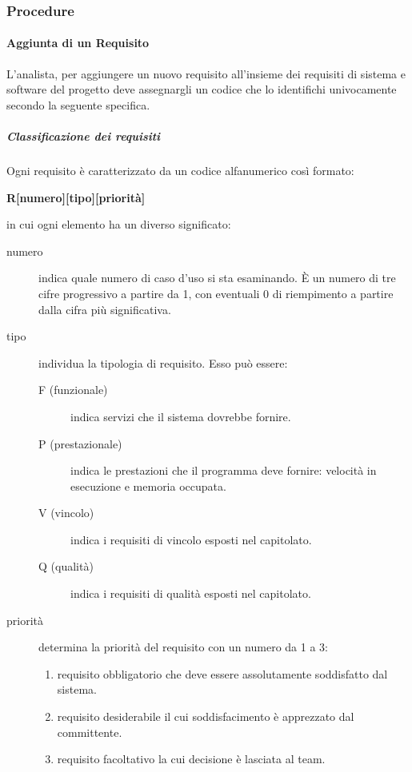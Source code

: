 \documentclass[../../norme-di-progetto.tex]{subfiles}
\begin{document}


\subsubsection{Procedure}%
\label{subs:procedure}

\paragraph{Aggiunta di un Requisito}%
\label{par:aggiunta_requisito}
L'analista, per aggiungere un nuovo requisito all'insieme dei requisiti di sistema e software del progetto deve assegnargli un codice che lo identifichi univocamente secondo la seguente specifica.

\subparagraph{Classificazione dei requisiti}%
\label{subp:classificazione_dei_requisiti}

Ogni requisito è caratterizzato da un codice alfanumerico così formato:
\begin{center}
  \textbf{R[numero][tipo][priorità]}
\end{center}
in cui ogni elemento ha un diverso significato:
\begin{description}
  \item [numero] indica quale numero di caso d'uso si sta esaminando. È un numero di tre cifre progressivo a partire da 1, con eventuali 0 di riempimento a partire dalla cifra più significativa.
  \item [tipo] individua la tipologia di requisito. Esso può essere:
        \begin{description}
          \item [F (funzionale)] indica servizi che il sistema dovrebbe fornire.
          \item [P (prestazionale)] indica le prestazioni che il programma deve fornire: velocità in esecuzione e memoria occupata.
          \item [V (vincolo)] indica i requisiti di vincolo esposti nel capitolato.
          \item [Q (qualità)] indica i requisiti di qualità esposti nel capitolato.
        \end{description}
  \item [priorità] determina la priorità del requisito con un numero da 1 a 3:
        \begin{enumerate}
          \item requisito obbligatorio che deve essere assolutamente soddisfatto dal sistema.
          \item requisito desiderabile il cui soddisfacimento è apprezzato dal committente.
          \item requisito facoltativo la cui decisione è lasciata al team.
        \end{enumerate}
\end{description}
\end{document}
